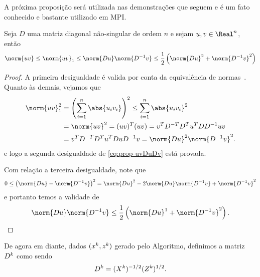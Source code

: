 
A próxima proposição será utilizada nas demonstrações que seguem e é um fato conhecido e bastante utilizado em \ac{MPI}.

\begin{prop}\label{prop:norm-uv}
	Seja $D$ uma matriz diagonal não-singular de ordem $n$ e sejam $u,v\in\Real^n$, então 
	\begin{equation}
		\label{eq:prop-uvDuDv}
		\norm{uv}\leq \norm{uv}_1 \leq \norm{Du}\norm{D^{-1}v} \leq \frac{1}{2}\left(\norm{Du}^{2} + \norm{D^{-1}v}^{2}\right)
	\end{equation}
\end{prop}
\begin{proof} A primeira desigualdade é valida por conta da equivalência de normas~\cite[p.~53]{Golub:1996wp}. Quanto às demais, vejamos que 
\[
	\begin{aligned}
		\norm{uv}_1^{2} & = \left( \sum_{i=1}^{n}\abs{u_i v_i}  \right)^{2} \leq  \sum_{i=1}^{n}\abs{u_iv_i}^{2}\\
						& = \norm{uv}^{2} = (uv)^{T}(uv)  = v^{T}D^{-T}D^{T}u^{T}DD^{-1} uv\\
						& = v^{T}D^{-T}D^{T}u^{T}DuD^{-1}v = \norm{Du}^{2}\norm{D^{-1}v}^{2}.
	\end{aligned}
	\]
e logo a segunda desigualdade de \eqref{eq:prop-uvDuDv} está provada. 

Com relação a terceira desigualdade, note que  
\[
0 \leq \left(\norm{Du} - \norm{D^{-1}v}\right)^{2} = \norm{Du}^{2} - 2\norm{Du}\norm{D^{-1}v} + \norm{D^{-1}v}^{2}
\]
e portanto temos a validade de
\[
\norm{Du}\norm{D^{-1}v} \leq \frac{1}{2}\left(\norm{Du}^{1} + \norm{D^{-1}v}^{2}\right). \qedhere
\]
\end{proof}

De agora em diante, dados $(x^{k},z^{k})$ gerado pelo Algoritmo, definimos a matriz $D^{k}$ como sendo
\[
D^{k} =(X^{k})^{-1/2}(Z^{k})^{1/2}.
\]

